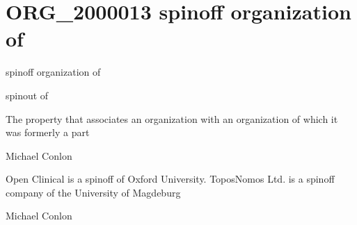 \documentclass[letterpaper,10pt,english]{sphinxmanual}
\begin{document}
\section{ORG\_2000013 \sphinxhyphen{} spin\sphinxhyphen{}off organization of}
\label{\detokenize{doc-ORG_2000013:org-2000013-spin-off-organization-of}}\label{\detokenize{doc-ORG_2000013:index-0}}\label{\detokenize{doc-ORG_2000013::doc}}
\begin{sphinxShadowBox}

\sphinxAtStartPar
spin\sphinxhyphen{}off organization of
\end{sphinxShadowBox}

\begin{sphinxShadowBox}

\sphinxAtStartPar
spinout of
\end{sphinxShadowBox}

\begin{sphinxShadowBox}

\sphinxAtStartPar
The property that associates an organization with an organization of which it was formerly a part
\end{sphinxShadowBox}

\begin{sphinxShadowBox}

\sphinxAtStartPar
Michael Conlon 
\end{sphinxShadowBox}

\begin{sphinxShadowBox}

\sphinxAtStartPar
Open Clinical is a spin\sphinxhyphen{}off of Oxford University. ToposNomos Ltd. is a spin\sphinxhyphen{}off company of the University of Magdeburg
\end{sphinxShadowBox}

\begin{sphinxShadowBox}

\sphinxAtStartPar
Michael Conlon 
\end{sphinxShadowBox}
\begin{quote}
\label{\detokenize{doc-ORG_2000014:org-2000014}}\label{\detokenize{doc-ORG_2000014:has-organizational-member}}\label{\detokenize{doc-ORG_2000014:org-2000014}}
\ignorespaces \end{quote}
\end{document}
